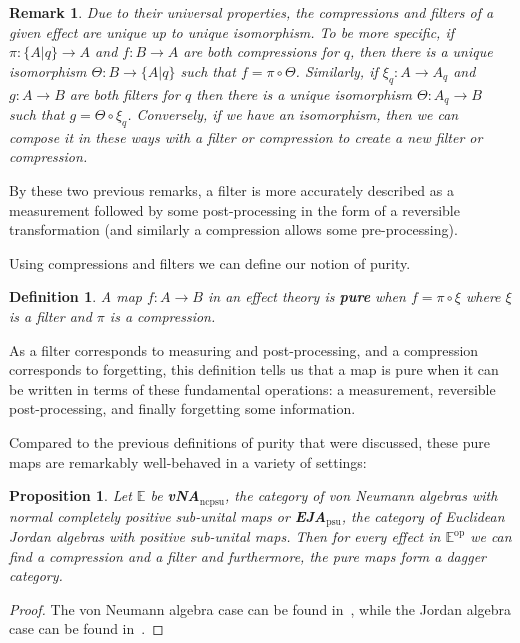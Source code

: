 \documentclass[b5paper,onecolumn,12pt,accepted=2019-05-03, issue=1, volume=1, shorttitle=papers/compositionality-1-1]{compositionalityarticle}
\newcounter{counter}
\numberwithin{counter}{section}
\newtheorem{proposition}[counter]{Proposition}
\newtheorem{definition}[counter]{Definition}
\newtheorem{remark}[counter]{Remark}
\begin{document}
\begin{remark}
    Due to their universal properties, the compressions and filters of a given effect are unique up to unique isomorphism. To be more specific, if $\pi:\{A\lvert q\}\rightarrow A$ and $f:B\rightarrow A$ are both compressions for $q$, then there is a unique isomorphism $\Theta:B\rightarrow \{A\lvert q\}$ such that $f = \pi\circ\Theta$. Similarly, if $\xi_q:A\rightarrow A_q$ and $g:A\rightarrow B$ are both filters for $q$ then there is a unique isomorphism $\Theta:A_q\rightarrow B$ such that $g=\Theta\circ\xi_q$. 
    Conversely, if we have an isomorphism, then we can compose it in these ways with a filter or compression to create a new filter or compression.
\end{remark}

By these two previous remarks, a filter is more accurately described as a measurement followed by some post-processing in the form of a reversible transformation (and similarly a compression allows some pre-processing).

Using compressions and filters we can define our notion of purity.
\begin{definition}\label{def:pure}
    A map $f:A\rightarrow B$ in an effect theory is \textbf{pure} when $f=\pi\circ\xi$ where $\xi$ is a filter and $\pi$ is a compression.
\end{definition}

As a filter corresponds to measuring and post-processing, and a compression corresponds to forgetting, this definition tells us that a map is pure when it can be written in terms of these fundamental operations: a measurement, reversible post-processing, and finally forgetting some information.

Compared to the previous definitions of purity that were discussed, these pure maps are remarkably well-behaved in a variety of settings:

\begin{proposition}
    Let $\mathbb{E}$ be \textbf{vNA}$_{\text{ncpsu}}$, the category of von Neumann algebras with normal completely positive sub-unital maps or \textbf{EJA}$_{\text{psu}}$, the category of Euclidean Jordan algebras with positive sub-unital maps. Then for every effect in $\mathbb{E}^{\text{op}}$ we can find a compression and a filter and furthermore, the pure maps form a dagger category.
\end{proposition}
\begin{proof}
    The von Neumann algebra case can be found in~\cite{westerbaan2016universal,bramthesis}, while the Jordan algebra case can be found in~\cite{westerbaan2018puremaps}.
\end{proof}
\end{document}
